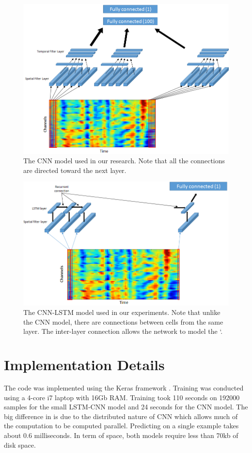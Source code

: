 \documentclass[
12pt, %
english, %
doublespacing, %
headsepline, %
]{MastersDoctoralThesis} %
\begin{document}
\begin{figure}
	\centering
	\includegraphics[width=1.1\linewidth]{Figures/CNN_detailed}
	\caption{The CNN model used in our research. Note that all the connections are directed toward the next layer.}
	\label{fig:CNN_detailed}
\end{figure}


\begin{figure}
	\centering
	\includegraphics[width=1.1\linewidth]{Figures/LSTM_CNN_detailed}
	\caption{The CNN-LSTM model used in our experiments. Note that unlike the CNN model, there are connections between cells from the same layer. The inter-layer connection allows the network to model the `.}
	\label{fig:LSTM_CNN_detailed}
\end{figure}

\section{Implementation Details}
The code was implemented using the Keras framework \cite{chollet2015keras}. Training was conducted using a 4-core i7 laptop with 16Gb RAM. Training took 110 seconds on 192000 samples for the small LSTM-CNN model and 24 seconds for the CNN model. The big difference in is due to the distributed nature of  CNN which allows much of the computation to be computed parallel. Predicting on a single example takes about 0.6 milliseconds. In term of space, both models require less than 70kb of disk space.
\end{document}
